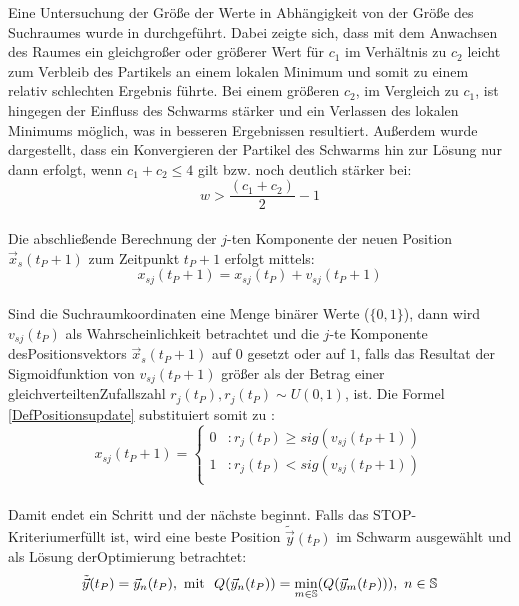   Eine Untersuchung der Größe der Werte in Abhängigkeit von der Größe des Suchraumes wurde in \cite{Engel2005} durchgeführt. Dabei zeigte sich, dass mit dem Anwachsen des Raumes ein gleichgroßer oder größerer Wert für $c_1$ im Verhältnis zu $c_2$ leicht zum Verbleib des Partikels an einem lokalen Minimum und somit zu einem relativ schlechten Ergebnis führte. Bei einem größeren $c_2$, im Vergleich zu $c_1$, ist hingegen der Einfluss des Schwarms stärker und ein Verlassen des lokalen Minimums möglich, was in besseren Ergebnissen resultiert. Außerdem wurde dargestellt, dass ein Konvergieren der Partikel des Schwarms hin zur Lösung nur dann erfolgt, wenn $c_1+c_2 \leq 4$ gilt bzw. noch deutlich stärker bei:
  \begin{equation}
    w > \frac{(c_1+c_2)}{2}-1
  \end{equation}\\

  \noindent Die abschließende Berechnung der $j$-ten Komponente der neuen Position $\vec{x}_s(t_P+1)$ zum Zeitpunkt $t_P+1$ erfolgt mittels:
  \begin{equation}\label{DefPositionsupdate}
    x_{sj}(t_P+1) = x_{sj}(t_P) + v_{sj}(t_P+1)
  \end{equation}\\

  \noindent Sind die Suchraumkoordinaten eine Menge binärer Werte ($\lbrace 0, 1\rbrace$), dann wird $v_{sj}(t_P)$ als Wahrscheinlichkeit betrachtet und die $j$-te Komponente des\linebreak Positionsvektors $\vec{x}_s(t_P+1)$ auf $0$ gesetzt oder auf $1$, falls das Resultat der Sigmoidfunktion von $v_{sj}(t_P+1)$ größer als der Betrag einer gleichverteilten\linebreak Zufallszahl $r_j(t_P), r_j(t_P)\sim U(0,1)$, ist. Die Formel \ref{DefPositionsupdate} substituiert somit zu \cite{Kennedy1997}:\linebreak
  \begin{equation}\label{DefPositionsupdateBinary}
    x_{sj}(t_P+1) = \begin{cases}
    		     0 & : r_j(t_P) \geq sig(v_{sj}(t_P+1))\\
		     1 & : r_j(t_P) < sig(v_{sj}(t_P+1))\\
		   \end{cases}
  \end{equation}\\

  \noindent Damit endet ein Schritt und der nächste beginnt. Falls das STOP-Kriterium\linebreak erfüllt ist, wird eine beste Position $\tilde{\vec{y}}(t_P)$ im Schwarm ausgewählt und als Lösung der\linebreak Optimierung betrachtet:
  \begin{equation}\label{DefGlobalBest}
    \tilde{\vec{y}}(t_P) = \vec{y}_n(t_P),\textrm{\space mit \space} Q(\vec{y}_n(t_P)) = \min_{m\in\mathbb{S}}(Q(\vec{y}_m(t_P))),\textrm{\space} n\in\mathbb{S}
  \end{equation}
\pagebreak
